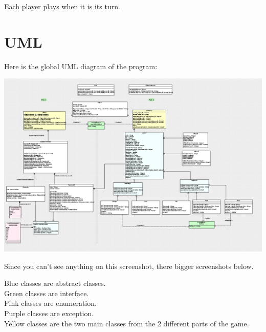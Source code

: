Each player plays when it is its turn.

\section{UML}

Here is the global UML diagram of the program:

\includegraphics[width=450pt]{../../Images/UMLdiagramme.png}

Since you can't see anything on this screenshot, there bigger screenshots below.

Blue classes are abstract classes.\\
Green classes are interface.\\
Pink classes are enumeration.\\
Purple classes are exception.\\
Yellow classes are the two main classes from the 2 different parts of the game.\\


